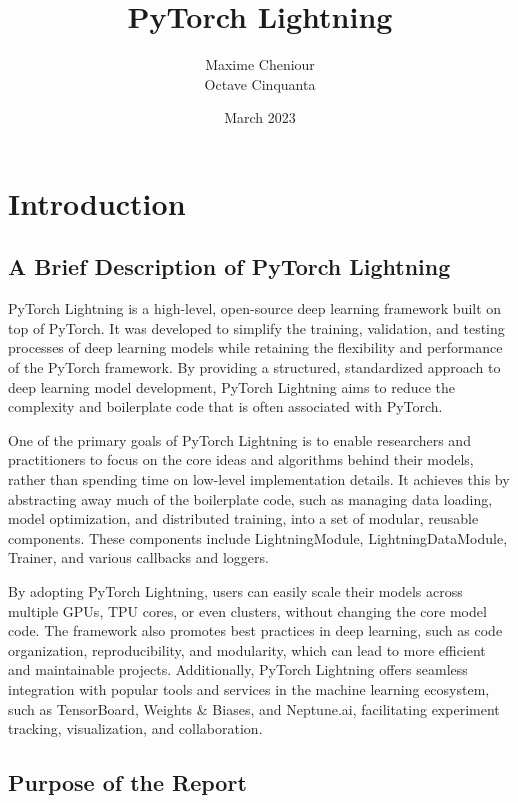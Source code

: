 \documentclass[12pt]{article}
\title{\textbf{PyTorch Lightning}}
\author{Maxime Cheniour \\ Octave Cinquanta}
\date{March 2023}
\begin{document}
\maketitle

\tableofcontents


\section{Introduction}

\subsection{A Brief Description of PyTorch Lightning}

PyTorch Lightning is a high-level, open-source deep learning framework built on top of PyTorch.
It was developed to simplify the training, validation, and testing processes of deep learning models while retaining the flexibility and performance of the PyTorch framework.
By providing a structured, standardized approach to deep learning model development, PyTorch Lightning aims to reduce the complexity and boilerplate code that is often associated with PyTorch.

One of the primary goals of PyTorch Lightning is to enable researchers and practitioners to focus on the core ideas and algorithms behind their models, rather than spending time on low-level implementation details.
It achieves this by abstracting away much of the boilerplate code, such as managing data loading, model optimization, and distributed training, into a set of modular, reusable components.
These components include LightningModule, LightningDataModule, Trainer, and various callbacks and loggers.

By adopting PyTorch Lightning, users can easily scale their models across multiple GPUs, TPU cores, or even clusters, without changing the core model code.
The framework also promotes best practices in deep learning, such as code organization, reproducibility, and modularity, which can lead to more efficient and maintainable projects.
Additionally, PyTorch Lightning offers seamless integration with popular tools and services in the machine learning ecosystem, such as TensorBoard, Weights \& Biases, and Neptune.ai, facilitating experiment tracking, visualization, and collaboration.

\subsection{Purpose of the Report}
\end{document}
